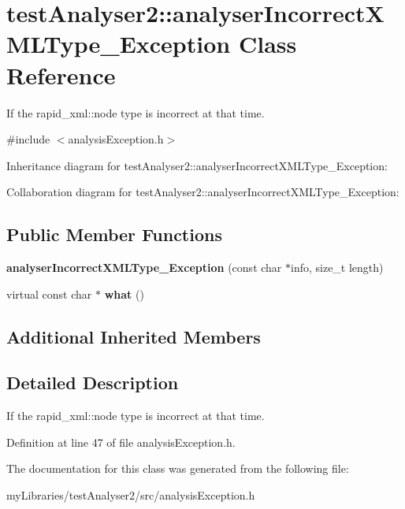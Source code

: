 \hypertarget{classtestAnalyser2_1_1analyserIncorrectXMLType__Exception}{}\section{test\+Analyser2\+::analyser\+Incorrect\+X\+M\+L\+Type\+\_\+\+Exception Class Reference}
\label{classtestAnalyser2_1_1analyserIncorrectXMLType__Exception}


If the rapid\+\_\+xml\+::node type is incorrect at that time.  




{\ttfamily \#include $<$analysis\+Exception.\+h$>$}



Inheritance diagram for test\+Analyser2\+::analyser\+Incorrect\+X\+M\+L\+Type\+\_\+\+Exception\+:


Collaboration diagram for test\+Analyser2\+::analyser\+Incorrect\+X\+M\+L\+Type\+\_\+\+Exception\+:
\subsection*{Public Member Functions}
\begin{DoxyCompactItemize}
\item 
\mbox{\label{classtestAnalyser2_1_1analyserIncorrectXMLType__Exception_acb58947a14a24e67ed09da39a0ec3241}} 
{\bfseries analyser\+Incorrect\+X\+M\+L\+Type\+\_\+\+Exception} (const char $\ast$info, size\+\_\+t length)
\item 
\mbox{\label{classtestAnalyser2_1_1analyserIncorrectXMLType__Exception_ad5a167614b56a5adc0496ecb043c948b}} 
virtual const char $\ast$ {\bfseries what} ()
\end{DoxyCompactItemize}
\subsection*{Additional Inherited Members}


\subsection{Detailed Description}
If the rapid\+\_\+xml\+::node type is incorrect at that time. 

Definition at line 47 of file analysis\+Exception.\+h.



The documentation for this class was generated from the following file\+:\begin{DoxyCompactItemize}
\item 
my\+Libraries/test\+Analyser2/src/analysis\+Exception.\+h\end{DoxyCompactItemize}

